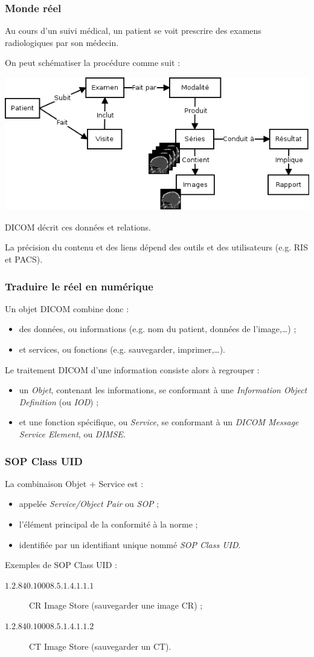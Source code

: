 	\frame
	{
		\frametitle{Monde r\'eel}
		Au cours d'un suivi m\'edical, un patient se voit prescrire des examens radiologiques par son m\'edecin.
		
		On peut sch\'ematiser la proc\'edure comme suit :
		
		\includegraphics[width=\linewidth]{./figures/scenario.png}
		
		DICOM d\'ecrit ces donn\'ees et relations.
		
		La pr\'ecision du contenu et des liens d\'epend des outils et des utilisateurs (e.g. RIS et PACS).
	}

	\frame
	{
		\frametitle{Traduire le r\'eel en num\'erique}
		
		Un objet DICOM combine donc :
		\begin{itemize}
			\item des donn\'ees, ou informations (e.g. nom du patient, donn\'ees de l'image,\ldots) ;
			\item et services, ou fonctions (e.g. sauvegarder, imprimer,\ldots).
		\end{itemize}
		
		Le traitement DICOM d'une information consiste alors \`a regrouper :
		\begin{itemize}
			\item un \emph{Objet}, contenant les informations, se conformant \`a une \emph{Information Object Definition} (ou \emph{IOD}) ;
			\item et une fonction sp\'ecifique, ou \emph{Service}, se conformant \`a un \emph{DICOM Message Service Element}, ou \emph{DIMSE}.
		\end{itemize}
	}
	
	\frame
	{
		\frametitle{SOP Class UID}		

		La combinaison Objet + Service est :
		\begin{itemize}
			\item appel\'ee \emph{Service/Object Pair} ou \emph{SOP} ;
			\item l'\'el\'ement principal de la conformit\'e \`a la norme ;
			\item identifi\'ee par un identifiant unique nomm\'e \emph{SOP Class UID}.
		\end{itemize}
		
		Exemples de SOP Class UID :
		\begin{description}
			\item[$1.2.840.10008.5.1.4.1.1.1$] CR Image Store (sauvegarder  une image CR) ;
			\item[$1.2.840.10008.5.1.4.1.1.2$] CT Image Store (sauvegarder  un CT).
		\end{description}
	}
	
